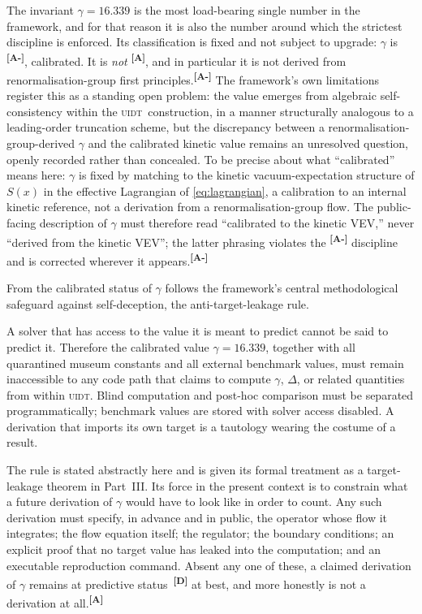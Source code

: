 \documentclass[12pt,a4paper,twoside]{article}
\theoremstyle{plain}
\theoremstyle{definition}
\theoremstyle{remark}
\newcommand{\UIDT}{\textsc{uidt}}
\newcommand{\catmark}[1]{\textsuperscript{\textsf{\textbf{[#1]}}}}
\newcommand{\Sx}{S(x)}
\newcommand{\GammaGeom}{16.339} %
\begin{document}
The invariant $\gamma = \GammaGeom$ is the most load-bearing single number in the framework, and for that reason it is also the number around which the strictest discipline is enforced. Its classification is fixed and not subject to upgrade: $\gamma$ is \catmark{A-}, calibrated. It is \emph{not} \catmark{A}, and in particular it is not derived from renormalisation-group first principles.\catmark{A-} The framework's own limitations register this as a standing open problem: the value emerges from algebraic self-consistency within the \UIDT\ construction, in a manner structurally analogous to a leading-order truncation scheme, but the discrepancy between a renormalisation-group-derived $\gamma$ and the calibrated kinetic value remains an unresolved question, openly recorded rather than concealed. To be precise about what ``calibrated'' means here: $\gamma$ is fixed by matching to the kinetic vacuum-expectation structure of $\Sx$ in the effective Lagrangian of \cref{eq:lagrangian}, a calibration to an internal kinetic reference, not a derivation from a renormalisation-group flow. The public-facing description of $\gamma$ must therefore read ``calibrated to the kinetic VEV,'' never ``derived from the kinetic VEV''; the latter phrasing violates the \catmark{A-} discipline and is corrected wherever it appears.\catmark{A-}

From the calibrated status of $\gamma$ follows the framework's central methodological safeguard against self-deception, the anti-target-leakage rule.

\begin{governancebox}
A solver that has access to the value it is meant to predict cannot be said to predict it. Therefore the calibrated value $\gamma = 16.339$, together with all quarantined museum constants and all external benchmark values, must remain inaccessible to any code path that claims to compute $\gamma$, $\Delta$, or related quantities from within \UIDT. Blind computation and post-hoc comparison must be separated programmatically; benchmark values are stored with solver access disabled. A derivation that imports its own target is a tautology wearing the costume of a result.
\end{governancebox}

\noindent The rule is stated abstractly here and is given its formal treatment as a target-leakage theorem in Part~III. Its force in the present context is to constrain what a future derivation of $\gamma$ would have to look like in order to count. Any such derivation must specify, in advance and in public, the operator whose flow it integrates; the flow equation itself; the regulator; the boundary conditions; an explicit proof that no target value has leaked into the computation; and an executable reproduction command. Absent any one of these, a claimed derivation of $\gamma$ remains at predictive status~\catmark{D} at best, and more honestly is not a derivation at all.\catmark{A}
\end{document}
